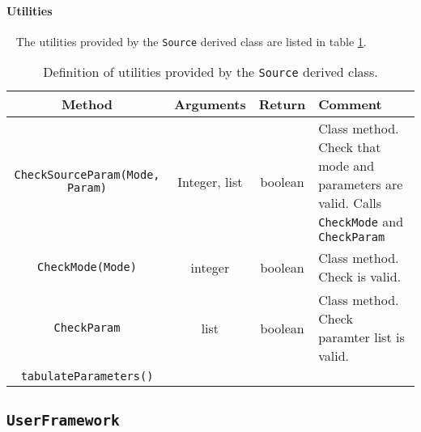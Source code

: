 \paragraph{Utilities} ~\newline
\noindent
The utilities provided by the \texttt{Source} derived class are listed
in table \ref{Tab:Source:Utils}.
\begin{table}[h]
  \caption{
    Definition of utilities provided by the \texttt{Source}
    derived class. 
  }
  \label{Tab:Source:Utils}
  \begin{center}
    \begin{tabular}{|c|c|c|p{5cm}|}
      \hline
      \textbf{Method} & \textbf{Arguments} & \textbf{Return}  & \textbf{Comment}                                                 \\
      \hline
      \texttt{CheckSourceParam(Mode, Param)} & Integer, list & boolean & Class method. Check that mode and parameters are valid.
                                                                         Calls \texttt{CheckMode} and \texttt{CheckParam}                  \\
      \texttt{CheckMode(Mode)}               & integer & boolean       & Class method. Check is valid.                                     \\
      \texttt{CheckParam}                    & list    & boolean       & Class method. Check paramter list is valid.                       \\
      \texttt{tabulateParameters()} &         &               &                                                             \\
      \hline
    \end{tabular}
  \end{center}
\end{table}

\FloatBarrier

\subsection{\texttt{UserFramework}}
\label{SubSubSect:UsrFrmwrk}

